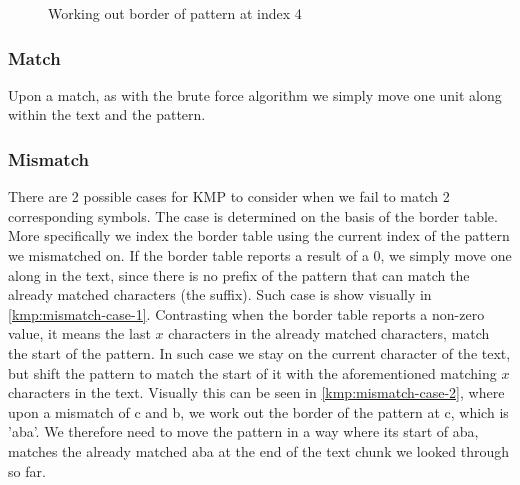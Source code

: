 \documentclass{l4proj}
\begin{document}
\begin{figure}[hpt]
  \centering
  \caption{Working out border of pattern at index 4}
  \label{fig:kmp-pre-process}
\end{figure}

\subsubsection{Match}
Upon a match, as with the brute force algorithm we simply move one unit along within the text and the pattern.
\\

\subsubsection{Mismatch} There are 2 possible cases for KMP to consider when we fail to match 2 corresponding symbols. The case is determined on the basis of the border table. More specifically we index the border table using the current index of the pattern we mismatched on.  If the border table reports a result of a 0, we simply move one along in the text, since there is no prefix of the pattern that can match the already matched characters (the suffix). Such case is show visually in \ref{kmp:mismatch-case-1}.
Contrasting when the border table reports a non-zero value, it means the last $x$ characters in the already matched characters, match the start of the pattern. In such case we stay on the current character of the text, but shift the pattern to match the start of it with the aforementioned matching $x$ characters in the text. Visually this can be seen in \ref{kmp:mismatch-case-2}, where upon a mismatch of c and b, we work out the border of the pattern at c, which is 'aba'. We therefore need to move the pattern in a way where its start of aba, matches the already matched aba at the end of the text chunk we looked through so far.
\end{document}
